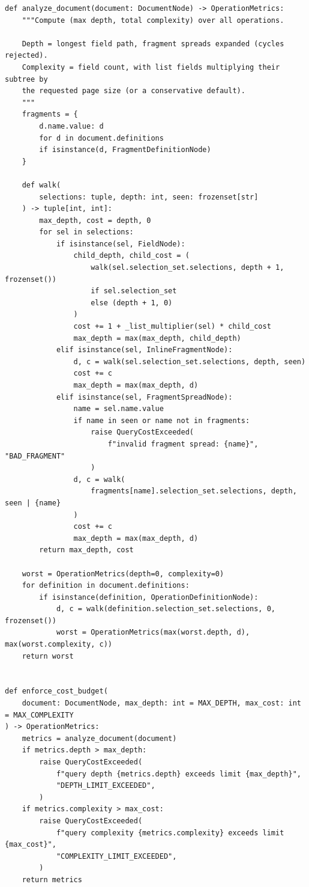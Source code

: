 \begin{verbatim}
def analyze_document(document: DocumentNode) -> OperationMetrics:
    """Compute (max depth, total complexity) over all operations.

    Depth = longest field path, fragment spreads expanded (cycles rejected).
    Complexity = field count, with list fields multiplying their subtree by
    the requested page size (or a conservative default).
    """
    fragments = {
        d.name.value: d
        for d in document.definitions
        if isinstance(d, FragmentDefinitionNode)
    }

    def walk(
        selections: tuple, depth: int, seen: frozenset[str]
    ) -> tuple[int, int]:
        max_depth, cost = depth, 0
        for sel in selections:
            if isinstance(sel, FieldNode):
                child_depth, child_cost = (
                    walk(sel.selection_set.selections, depth + 1, frozenset())
                    if sel.selection_set
                    else (depth + 1, 0)
                )
                cost += 1 + _list_multiplier(sel) * child_cost
                max_depth = max(max_depth, child_depth)
            elif isinstance(sel, InlineFragmentNode):
                d, c = walk(sel.selection_set.selections, depth, seen)
                cost += c
                max_depth = max(max_depth, d)
            elif isinstance(sel, FragmentSpreadNode):
                name = sel.name.value
                if name in seen or name not in fragments:
                    raise QueryCostExceeded(
                        f"invalid fragment spread: {name}", "BAD_FRAGMENT"
                    )
                d, c = walk(
                    fragments[name].selection_set.selections, depth, seen | {name}
                )
                cost += c
                max_depth = max(max_depth, d)
        return max_depth, cost

    worst = OperationMetrics(depth=0, complexity=0)
    for definition in document.definitions:
        if isinstance(definition, OperationDefinitionNode):
            d, c = walk(definition.selection_set.selections, 0, frozenset())
            worst = OperationMetrics(max(worst.depth, d), max(worst.complexity, c))
    return worst


def enforce_cost_budget(
    document: DocumentNode, max_depth: int = MAX_DEPTH, max_cost: int = MAX_COMPLEXITY
) -> OperationMetrics:
    metrics = analyze_document(document)
    if metrics.depth > max_depth:
        raise QueryCostExceeded(
            f"query depth {metrics.depth} exceeds limit {max_depth}",
            "DEPTH_LIMIT_EXCEEDED",
        )
    if metrics.complexity > max_cost:
        raise QueryCostExceeded(
            f"query complexity {metrics.complexity} exceeds limit {max_cost}",
            "COMPLEXITY_LIMIT_EXCEEDED",
        )
    return metrics



\end{verbatim}
